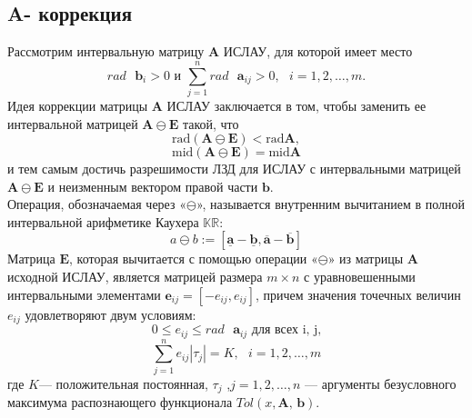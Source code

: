 \documentclass[10pt]{article}
\begin{document}
\subsection{A- коррекция}
Рассмотрим интервальную матрицу \textbf{A} ИСЛАУ, для которой имеет место
\begin{equation*}
    rad \text{ }\mathbf{b}_i>0 \text{ и } \sum_{j=1}^{n}rad\text{ }\mathbf{a}_{ij}>0,\text{ }i=1,2,\dots,m.
\end{equation*}
Идея коррекции матрицы \textbf{A} ИСЛАУ заключается в том, чтобы заменить ее интервальной матрицей
  \( \mathbf{A} \ominus \mathbf{E} \) такой, что
  \[
    \text{rad} (\mathbf{A} \ominus \mathbf{E}) < \text{rad} \mathbf{A}, \]
   \[\text{mid} (\mathbf{A} \ominus \mathbf{E}) = \text{mid} \mathbf{A} \]
и тем самым достичь разрешимости ЛЗД для ИСЛАУ с интервальными
матрицей \( \mathbf{A} \ominus \mathbf{E} \) и неизменным вектором правой части $\mathbf{b}$.\\
Операция, обозначаемая через «$\ominus$», называется внутренним вычитанием в полной интервальной арифметике Каухера $\mathbb{KR}$:
\begin{equation*}
    a \ominus b:=[\underline{\mathbf{a}}-\underline{\mathbf{b}},\overline{\mathbf{a}}-\overline{\mathbf{b}}]
\end{equation*}
Матрица $\mathbf{E}$, которая вычитается с помощью операции «$\ominus$» из матрицы $\mathbf{A}$ исходной ИСЛАУ, является матрицей размера $m \times n$ с уравновешенными интервальными элементами $\mathbf{e}_{ij} = [-e_{ij}, e_{ij}]$, причем значения точечных величин $e_{ij}$ удовлетворяют двум условиям:
  \[
    0 \leq e_{ij} \leq rad \text{ }\mathbf{a}_{ij} \text{ для всех i, j,} \]
   \[\sum_{j=1}^{n}e_{ij}|\tau_j|=K, \text{ }i=1,2,\dots,m \]
где $K$— положительная постоянная, $\tau_j$ ,$j=1,2,\dots,n$ — аргументы безусловного максимума распознающего функционала $Tol(x,\textbf{A, b})$.
\end{document}
